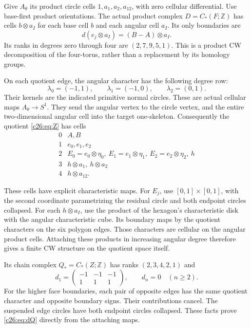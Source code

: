 Give $A_\theta$ its product circle cells
$1,a_1,a_2,a_{12}$, with zero cellular differential.
Use base-first product orientations.
The actual product complex $D=C_*(F;\mathbb Z)$ has cells
$b\otimes a_I$ for each base cell $b$ and each angular cell $a_I$.
Its only boundaries are
\begin{equation}\label{c26:eq:dD}
d(e_j\otimes a_I)=(B-A)\otimes a_I.
\end{equation}
Its ranks in degrees zero through four are $(2,7,9,5,1)$.
This is a product CW decomposition of the four-torus, rather than a
replacement by its homology groups.

On each quotient edge, the angular character has the following degree row:
\begin{equation}\label{c26:eq:characters}
\lambda_0=(-1,1),\qquad \lambda_1=(-1,0),\qquad \lambda_2=(0,1).
\end{equation}
Their kernels are the indicated primitive normal circles.
These are actual cellular maps $A_\theta\to S^1$.
They send the angular vertex to the circle vertex, and the entire
two-dimensional angular cell into the target one-skeleton.
Consequently the quotient \eqref{c26:eq:Z} has cells
\[
\begin{array}{c|l}
0&A,B\\
1&e_0,e_1,e_2\\
2&E_0=e_0\otimes\eta_0,\ E_1=e_1\otimes\eta_1,\ E_2=e_2\otimes\eta_2,\ h\\
3&h\otimes a_1,\ h\otimes a_2\\
4&h\otimes a_{12}.
\end{array}
\]

These cells have explicit characteristic maps.
For $E_j$, use $[0,1]\times[0,1]$, with the second coordinate
parametrizing the residual circle and both endpoint circles collapsed.
For each $h\otimes a_I$, use the product of the hexagon's characteristic
disk with the angular characteristic cube.
Its boundary maps by the quotient characters on the six polygon edges.
Those characters are cellular on the angular product cells.
Attaching these products in increasing angular degree therefore gives
a finite CW structure on the quotient space itself.

Its chain complex $Q_*=C_*(Z;\mathbb Z)$ has ranks $(2,3,4,2,1)$ and
\begin{equation}\label{c26:eq:dQ}
d_1=\begin{pmatrix}-1&-1&-1\\1&1&1\end{pmatrix},\qquad d_n=0\quad(n\ge2).
\end{equation}
For the higher face boundaries, each pair of opposite edges has the same
quotient character and opposite boundary signs. Their contributions cancel.
The suspended edge circles have both endpoint circles collapsed.
These facts prove \eqref{c26:eq:dQ} directly from the attaching maps.

